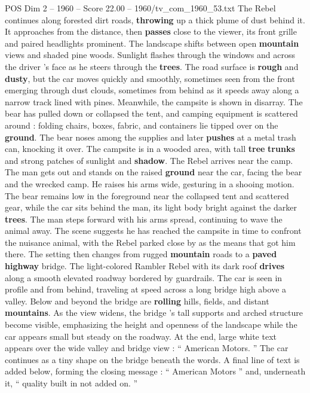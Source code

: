 \begin{textsample}{POS Dim 2 – 1960 – Score 22.00 – 1960/tv\_com\_1960\_53.txt}
The Rebel continues along forested dirt roads, \textbf{throwing} up a thick plume of dust behind it.
It approaches from the distance, then \textbf{passes} close to the viewer, its front grille and paired headlights prominent.
The landscape shifts between open \textbf{mountain} views and shaded pine woods.
Sunlight flashes through the windows and across the driver ’s face as he steers through the \textbf{trees}.
The road surface is \textbf{rough} and \textbf{dusty}, but the car moves quickly and smoothly, sometimes seen from the front emerging through dust clouds, sometimes from behind as it speeds away along a narrow track lined with pines.
Meanwhile, the campsite is shown in disarray.
The bear has pulled down or collapsed the tent, and camping equipment is scattered around : folding chairs, boxes, fabric, and containers lie tipped over on the \textbf{ground}.
The bear noses among the supplies and later \textbf{pushes} at a metal trash can, knocking it over.
The campsite is in a wooded area, with tall \textbf{tree} \textbf{trunks} and strong patches of sunlight and \textbf{shadow}.
The Rebel arrives near the camp.
The man gets out and stands on the raised \textbf{ground} near the car, facing the bear and the wrecked camp.
He raises his arms wide, gesturing in a shooing motion.
The bear remains low in the foreground near the collapsed tent and scattered gear, while the car sits behind the man, its light body bright against the darker \textbf{trees}.
The man steps forward with his arms spread, continuing to wave the animal away.
The scene suggests he has reached the campsite in time to confront the nuisance animal, with the Rebel parked close by as the means that got him there.
The setting then changes from rugged \textbf{mountain} roads to a \textbf{paved} \textbf{highway} bridge.
The light-colored Rambler Rebel with its dark roof \textbf{drives} along a smooth elevated roadway bordered by guardrails.
The car is seen in profile and from behind, traveling at speed across a long bridge high above a valley.
Below and beyond the bridge are \textbf{rolling} hills, fields, and distant \textbf{mountains}.
As the view widens, the bridge ’s tall supports and arched structure become visible, emphasizing the height and openness of the landscape while the car appears small but steady on the roadway.
At the end, large white text appears over the wide valley and bridge view : “ American Motors. ” The car continues as a tiny shape on the bridge beneath the words.
A final line of text is added below, forming the closing message : “ American Motors ” and, underneath it, “ quality built in not added on. ”

\end{textsample}
